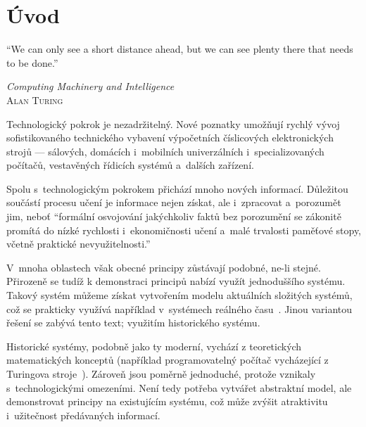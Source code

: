\chapter*{Úvod}
\setcounter{page}{1}

\epigraph{
	\enquote{We can only see a short distance ahead, but we can see plenty there that needs to be done.}
}{\textit{Computing Machinery and Intelligence}\\ \textsc{Alan Turing}}

Technologický pokrok je nezadržitelný. Nové poznatky umožňují rychlý vývoj sofistikovaného technického vybavení výpočetních číslicových elektronických strojů --- sálových, domácích i~mobilních univerzálních i~specializovaných počítačů, vestavěných řídicích systémů a~dalších zařízení.

Spolu s~technologickým pokrokem přichází mnoho nových informací. Důležitou součástí procesu učení je informace nejen získat, ale i~zpracovat a~porozumět jim, neboť \enquote{formální osvojování jakýchkoliv faktů bez porozumění se zákonitě promítá do nízké rychlosti i~ekonomičnosti učení a~malé trvalosti paměťové stopy, včetně praktické nevyužitelnosti.}~\cite{Zacharova2012:psychologie}

V~mnoha oblastech však obecné principy zůstávají podobné, ne-li stejné. Přirozeně se tudíž k demonstraci principů nabízí využít jednoduššího systému. Takový systém můžeme získat vytvořením modelu aktuálních složitých systémů, což se prakticky využívá například v~systémech reálného času~\cite{Kubatova2019:src-modely}. Jinou variantou řešení se zabývá tento text; využitím historického systému.

Historické systémy, podobně jako ty moderní, vychází z teoretických matematických konceptů (například programovatelný počítač vycházející z Turingova stroje~\cite{Teuscher2003:turing}). Zároveň jsou poměrně jednoduché, protože vznikaly s~technologickými omezeními. Není tedy potřeba vytvářet abstraktní model, ale demonstrovat principy na existujícím systému, což může zvýšit atraktivitu i~užitečnost předávaných informací.

